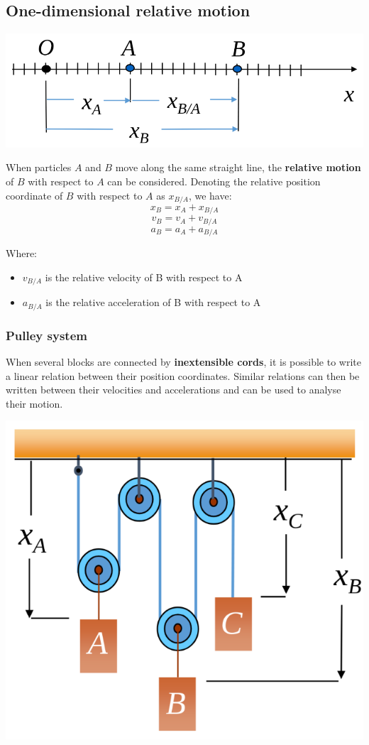 \documentclass[11pt]{article}
\begin{document}
 \newpage
\subsection{One-dimensional relative motion}
\label{sec:orgced1642}
\begin{center}
\includegraphics[width=.9\linewidth]{./images/one-dimensional-relative-motion.png}
\end{center}

When particles \(A\) and \(B\) move along the same straight line, the \textbf{relative motion} of \(B\) with respect to \(A\) can be considered. Denoting the relative position coordinate of \(B\) with respect to \(A\) as \(x_{B/A}\), we have:
\[x_B = x_A + x_{B/A}\]
\[v_B = v_A + v_{B/A}\]
\[a_B = a_A + a_{B/A}\]

Where:
\begin{itemize}
\item \(v_{B/A}\) is the relative velocity of B with respect to A
\item \(a_{B/A}\) is the relative acceleration of B with respect to A
\end{itemize}

 \newpage
\subsubsection{Pulley system}
\label{sec:org68d4898}
When several blocks are connected by \textbf{inextensible cords}, it is possible to write a linear relation between their position coordinates. Similar relations can then be written between their velocities and accelerations and can be used to analyse their motion.

\begin{center}
\includegraphics[width=.9\linewidth]{./images/pulley-system-diagram.png}
\end{center}
\end{document}
